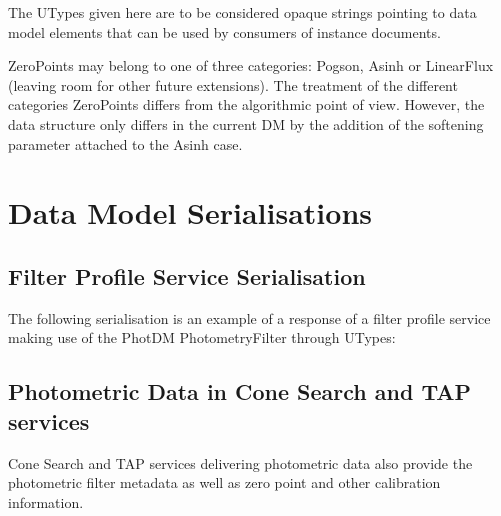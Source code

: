 \documentclass[11pt,a4paper]{ivoa}
\begin{document}
\begin{appendices}
The UTypes given here are to be considered opaque strings pointing to data model
elements that can be used by consumers of instance documents.

ZeroPoints may belong to one of three categories: Pogson, Asinh or LinearFlux
(leaving room for other future extensions). The treatment of the different
categories ZeroPoints differs from the algorithmic point of view.
However, the data structure only differs in the current DM by the addition
of the softening parameter attached to the Asinh case.

\par

\section{Data Model Serialisations} \label{serialisation}
\subsection{Filter Profile Service Serialisation} \label{serialisationfilter}


The following serialisation is an example of a response of a filter profile
service making use of the PhotDM PhotometryFilter through UTypes:
\par


\subsection{Photometric Data in Cone Search and TAP services}
Cone Search and TAP services delivering photometric data 
also provide the photometric filter metadata as well as zero point and other calibration information.


\end{appendices}
\end{document}
